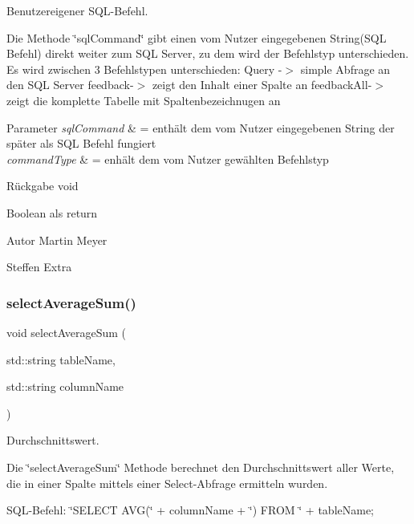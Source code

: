 Benutzereigener S\+Q\+L-\/\+Befehl. 

Die Methode \char`\"{}sql\+Command\char`\"{} gibt einen vom Nutzer eingegebenen String(\+S\+Q\+L Befehl) direkt weiter zum S\+QL Server, zu dem wird der Befehlstyp unterschieden. Es wird zwischen 3 Befehlstypen unterschieden\+: Query -\/$>$ simple Abfrage an den S\+QL Server feedback-\/$>$ zeigt den Inhalt einer Spalte an feedback\+All-\/$>$ zeigt die komplette Tabelle mit Spaltenbezeichnugen an


\begin{DoxyParams}{Parameter}
{\em sql\+Command} & = enthält dem vom Nutzer eingegebenen String der später als S\+QL Befehl fungiert \\
\hline
{\em command\+Type} & = enhält dem vom Nutzer gewählten Befehlstyp\\
\hline
\end{DoxyParams}
\begin{DoxyReturn}{Rückgabe}
void
\end{DoxyReturn}
Boolean als return \begin{DoxyAuthor}{Autor}
Martin Meyer 

Steffen Extra 
\end{DoxyAuthor}
\mbox{\label{selection_request_8hpp_a01bd0062142a17ad04b7101bac7b38b6}} 
\subsubsection{select\+Average\+Sum()}
{\footnotesize\ttfamily void select\+Average\+Sum (\begin{DoxyParamCaption}\item[{std\+::string}]{table\+Name,  }\item[{std\+::string}]{column\+Name }\end{DoxyParamCaption})}



Durchschnittswert. 

Die \char`\"{}select\+Average\+Sum\char`\"{} Methode berechnet den Durchschnittswert aller Werte, die in einer Spalte mittels einer Select-\/\+Abfrage ermitteln wurden.~\newline


S\+Q\+L-\/\+Befehl\+: \char`\"{}\+S\+E\+L\+E\+C\+T A\+V\+G(\char`\"{} + column\+Name + \char`\"{}) F\+R\+O\+M \char`\"{} + table\+Name;



